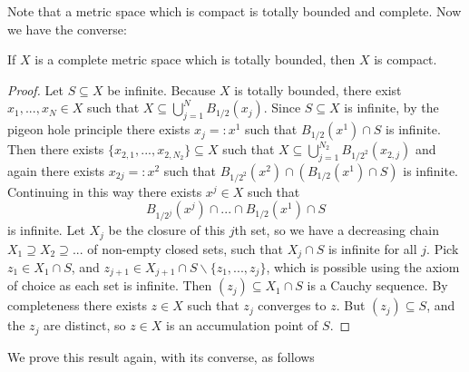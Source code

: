 Note that a metric space which is compact is totally bounded and complete. Now we have the converse:

\begin{proposition}\label{prop:2.3.7}
    If $X$ is a complete metric space which is totally bounded, then $X$ is compact.
\end{proposition}
\begin{proof}
    Let $S \subseteq X$ be infinite. Because $X$ is totally bounded, there exist $x_1,...,x_N \in X$ such that $X \subseteq \bigcup_{j=1}^NB_{1/2}(x_j)$. Since $S \subseteq X$ is infinite, by the pigeon hole principle there exists $x_j =: x^1$ such that $B_{1/2}(x^1)\cap S$ is infinite. Then there exists $\{x_{2,1},...,x_{2,N_2}\} \subseteq X$ such that $X \subseteq \bigcup_{j=1}^{N_2}B_{1/2^2}(x_{2,j})$ and again there exists $x_{2j} =: x^2$ such that $B_{1/2^2}(x^2) \cap (B_{1/2}(x^1)\cap S)$ is infinite. Continuing in this way there exists $x^j \in X$ such that \begin{equation*}
        B_{1/2^j}(x^j)\cap ... \cap B_{1/2}(x^1)\cap S
    \end{equation*}
    is infinite. Let $X_j$ be the closure of this $j$th set, so we have a decreasing chain $X_1 \supseteq X_2 \supseteq ...$ of non-empty closed sets, such that $X_j \cap S$ is infinite for all $j$. Pick $z_1\in X_1\cap S$, and $z_{j+1} \in X_{j+1}\cap S\backslash \{z_1,...,z_j\}$, which is possible using the axiom of choice as each set is infinite. Then $(z_j) \subseteq X_1 \cap S$ is a Cauchy sequence. By completeness there exists $z \in X$ such that $z_j$ converges to $z$. But $(z_j) \subseteq S$, and the $z_j$ are distinct, so $z \in X$ is an accumulation point of $S$.
\end{proof}

We prove this result again, with its converse, as follows

